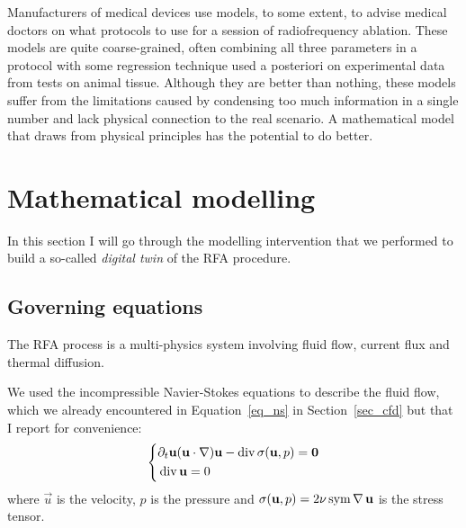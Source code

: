 Manufacturers of medical devices use models, to some extent, to advise medical doctors on what protocols to use for a session of radiofrequency ablation.
These models are quite coarse-grained, often combining all three parameters in a protocol with some regression technique used a posteriori on experimental data from tests on animal tissue.
Although they are better than nothing, these models suffer from the limitations caused by condensing too much information in a single number and lack physical connection to the real scenario.
A mathematical model that draws from physical principles has the potential to do better.

\section{Mathematical modelling}
\label{sec_rfaModel}
In this section I will go through the modelling intervention that we performed to build a so-called \emph{digital twin} of the RFA procedure.

\subsection{Governing equations}
\label{sub_rfaEquations}
The RFA process is a multi-physics system involving fluid flow, current flux and thermal diffusion.

We used the incompressible Navier-Stokes equations to describe the fluid flow, which we already encountered in Equation~\eqref{eq_ns} in Section~\ref{sec_cfd} but that I report for convenience:
\begin{equation}
  \left\{
    \begin{aligned}
      &\partial_{t} \mathbf{u} (\mathbf{u} \cdot \operatorname{\nabla}) \mathbf{u} - \operatorname{div}\sigma(\mathbf{u},p) = \mathbf{0} \\
      &\operatorname{div} \mathbf{u} = 0
    \end{aligned}
  \right.
  \label{eq_rfaNS}
\end{equation}
where \(\vec{u}\) is the velocity, \(p\) is the pressure and \(\sigma(\mathbf{u},p) = 2 \nu \operatorname{sym}\operatorname{\nabla} \mathbf{u}\) is the stress tensor.

